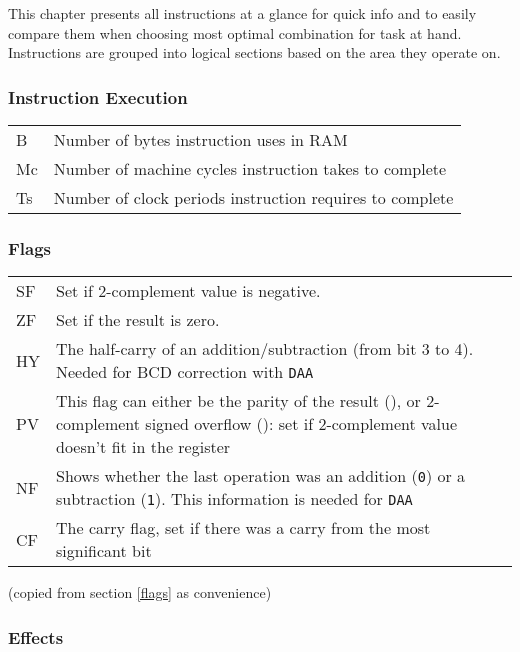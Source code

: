 \documentclass[12pt,twoside,openright,a4paper]{book}
\begin{document}
This chapter presents all instructions at a glance for quick info and to easily compare them when choosing most optimal combination for task at hand. Instructions are grouped into logical sections based on the area they operate on.

\minitoc

\pagebreak

\subsubsection{Instruction Execution}

\begin{tabular}{ll}
	B & 
		Number of bytes instruction uses in RAM\\
	Mc\notet & 
		Number of machine cycles instruction takes to complete\\
	Ts\notet & 
		Number of clock periods instruction requires to complete\\
\end{tabular}

\subsubsection{Flags}

\begin{tabular}{lp{13cm}}
	SF & 
		Set if 2-complement value is negative.\\
	ZF\notet & 
		Set if the result is zero. \\
	HY\notet & 
		The half-carry of an addition/subtraction (from bit 3 to 4). Needed for BCD correction with {\tt DAA} \\
	PV\notet & 
		This flag can either be the parity of the result ({\tt \FPP}), or 2-complement signed overflow ({\tt \FPV}): set if 2-complement value doesn’t fit in the register \\
	NF\notet & 
		Shows whether the last operation was an addition ({\tt 0}) or a subtraction ({\tt 1}). This information is needed for {\tt DAA} \\
	CF\notet & 
		The carry flag, set if there was a carry from the most significant bit \\
\end{tabular}

(copied from section \ref{flags} as convenience)

\subsubsection{Effects}
\end{document}
